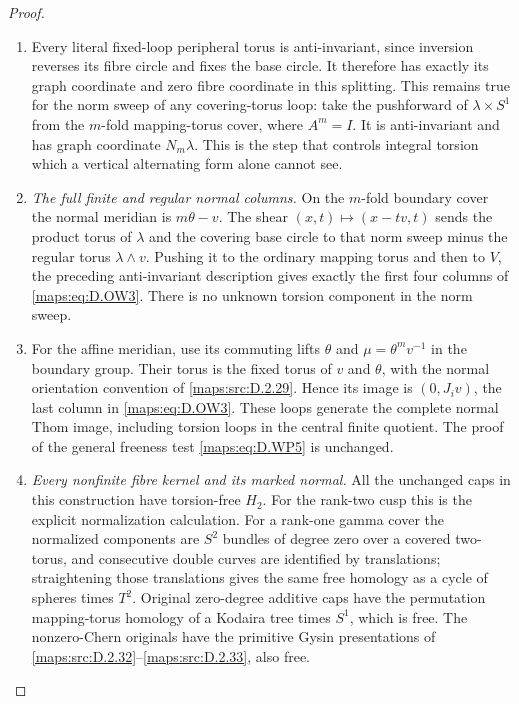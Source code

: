 \begin{proof}
\begin{enumerate}[label=\arabic*.,leftmargin=*]
\item Every literal fixed-loop peripheral torus is
anti-invariant, since inversion reverses its
fibre circle and fixes the base circle. It
therefore has exactly its graph coordinate and
zero fibre coordinate in this splitting.
This remains true for the norm sweep of any
covering-torus loop: take the pushforward of
$\lambda\times S^1$ from the $m$-fold mapping-torus
cover, where $A^m=I$. It is anti-invariant and
has graph coordinate $N_m\lambda$.
This is the step that controls integral torsion
which a vertical alternating form alone cannot see.

\item \emph{The full finite and regular normal columns.}
On the $m$-fold boundary cover the normal meridian
is $m\theta-v$. The shear
$(x,t)\mapsto(x-tv,t)$ sends the product torus
of $\lambda$ and the covering base circle to
that norm sweep minus the regular torus
$\lambda\wedge v$. Pushing it to the ordinary
mapping torus and then to $V$, the preceding
anti-invariant description gives exactly the
first four columns of \eqref{maps:eq:D.OW3}.
There is no unknown torsion component in the
norm sweep.

\item For the affine meridian, use its commuting lifts
$\theta$ and $\mu=\theta^m v^{-1}$ in the boundary
group. Their torus is the fixed torus of $v$
and $\theta$, with the normal orientation
convention of \ref{maps:src:D.2.29}. Hence its image is
$(0,J_iv)$, the last column in \eqref{maps:eq:D.OW3}.
These loops generate the complete normal Thom
image, including torsion loops in the central
finite quotient. The proof of the general
freeness test \eqref{maps:eq:D.WP5} is unchanged.

\item \emph{Every nonfinite fibre kernel and its marked normal.}
All the unchanged caps in this construction have
torsion-free $H_2$. For the rank-two cusp this is
the explicit normalization calculation. For a
rank-one gamma cover the normalized components
are $S^2$ bundles of degree zero over a covered
two-torus, and consecutive double curves are
identified by translations; straightening those
translations gives the same free homology as a
cycle of spheres times $T^2$. Original
zero-degree additive caps have the permutation
mapping-torus homology of a Kodaira tree times
$S^1$, which is free. The nonzero-Chern originals
have the primitive Gysin presentations of
\ref{maps:src:D.2.32}--\ref{maps:src:D.2.33}, also free.


\end{enumerate}
\end{proof}
